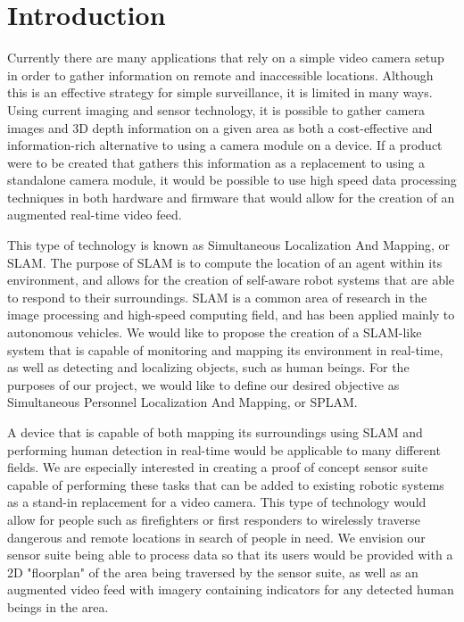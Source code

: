 \section{Introduction}
Currently there are many applications that rely on a simple video camera setup in order to gather information on remote and inaccessible locations. Although this is an effective strategy for simple surveillance, it is limited in many ways. Using current imaging and sensor technology, it is possible to gather camera images and 3D depth information on a given area as both a cost-effective and information-rich alternative to using a camera module on a device. If a product were to be created that gathers this information as a replacement to using a standalone camera module, it would be possible to use high speed data processing techniques in both hardware and firmware that would allow for the creation of an augmented real-time video feed.
\par
This type of technology is known as Simultaneous Localization And Mapping, or SLAM. The purpose of SLAM is to compute the location of an agent within its environment, and allows for the creation of self-aware robot systems that are able to respond to their surroundings. SLAM is a common area of research in the image processing and high-speed computing field, and has been applied mainly to autonomous vehicles. We would like to propose the creation of a SLAM-like system that is capable of monitoring and mapping its environment in real-time, as well as detecting and localizing objects, such as human beings. For the purposes of our project, we would like to define our desired objective as Simultaneous Personnel Localization And Mapping, or SPLAM. 
\par
A device that is capable of both mapping its surroundings using SLAM and performing human detection in real-time would be applicable to many different fields. We are especially interested in creating a proof of concept sensor suite capable of performing these tasks that can be added to existing robotic systems as a stand-in replacement for a video camera. This type of technology would allow for people such as firefighters or first responders to wirelessly traverse dangerous and remote locations in search of people in need. We envision our sensor suite being able to process data so that its users would be provided with a 2D "floorplan" of the area being traversed by the sensor suite, as well as an augmented video feed with imagery containing indicators for any detected human beings in the area. 
\par
